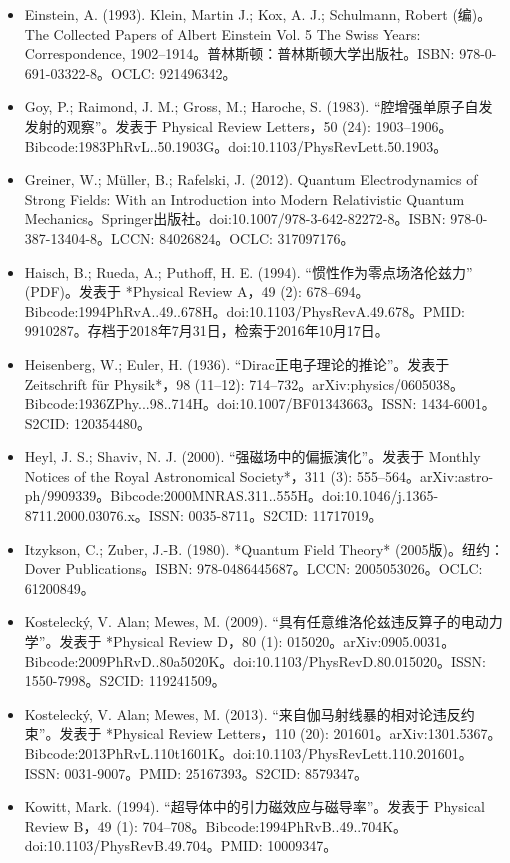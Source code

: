 \begin{itemize}
\item Einstein, A. (1993). Klein, Martin J.; Kox, A. J.; Schulmann, Robert (编)。The Collected Papers of Albert Einstein Vol. 5 The Swiss Years: Correspondence, 1902–1914。普林斯顿：普林斯顿大学出版社。ISBN: 978-0-691-03322-8。OCLC: 921496342。
\item Goy, P.; Raimond, J. M.; Gross, M.; Haroche, S. (1983). “腔增强单原子自发发射的观察”。发表于 Physical Review Letters，50 (24): 1903–1906。Bibcode:1983PhRvL..50.1903G。doi:10.1103/PhysRevLett.50.1903。
\item Greiner, W.; Müller, B.; Rafelski, J. (2012). Quantum Electrodynamics of Strong Fields: With an Introduction into Modern Relativistic Quantum Mechanics。Springer出版社。doi:10.1007/978-3-642-82272-8。ISBN: 978-0-387-13404-8。LCCN: 84026824。OCLC: 317097176。
\item Haisch, B.; Rueda, A.; Puthoff, H. E. (1994). “惯性作为零点场洛伦兹力” (PDF)。发表于 *Physical Review A，49 (2): 678–694。Bibcode:1994PhRvA..49..678H。doi:10.1103/PhysRevA.49.678。PMID: 9910287。存档于2018年7月31日，检索于2016年10月17日。
\item Heisenberg, W.; Euler, H. (1936). “Dirac正电子理论的推论”。发表于 Zeitschrift für Physik*，98 (11–12): 714–732。arXiv:physics/0605038。Bibcode:1936ZPhy...98..714H。doi:10.1007/BF01343663。ISSN: 1434-6001。S2CID: 120354480。
\item Heyl, J. S.; Shaviv, N. J. (2000). “强磁场中的偏振演化”。发表于 Monthly Notices of the Royal Astronomical Society*，311 (3): 555–564。arXiv:astro-ph/9909339。Bibcode:2000MNRAS.311..555H。doi:10.1046/j.1365-8711.2000.03076.x。ISSN: 0035-8711。S2CID: 11717019。
\item Itzykson, C.; Zuber, J.-B. (1980). *Quantum Field Theory* (2005版)。纽约：Dover Publications。ISBN: 978-0486445687。LCCN: 2005053026。OCLC: 61200849。
\item Kostelecký, V. Alan; Mewes, M. (2009). “具有任意维洛伦兹违反算子的电动力学”。发表于 *Physical Review D，80 (1): 015020。arXiv:0905.0031。Bibcode:2009PhRvD..80a5020K。doi:10.1103/PhysRevD.80.015020。ISSN: 1550-7998。S2CID: 119241509。
\item Kostelecký, V. Alan; Mewes, M. (2013). “来自伽马射线暴的相对论违反约束”。发表于 *Physical Review Letters，110 (20): 201601。arXiv:1301.5367。Bibcode:2013PhRvL.110t1601K。doi:10.1103/PhysRevLett.110.201601。ISSN: 0031-9007。PMID: 25167393。S2CID: 8579347。
\item Kowitt, Mark. (1994). “超导体中的引力磁效应与磁导率”。发表于 Physical Review B，49 (1): 704–708。Bibcode:1994PhRvB..49..704K。doi:10.1103/PhysRevB.49.704。PMID: 10009347。

\end{itemize}
